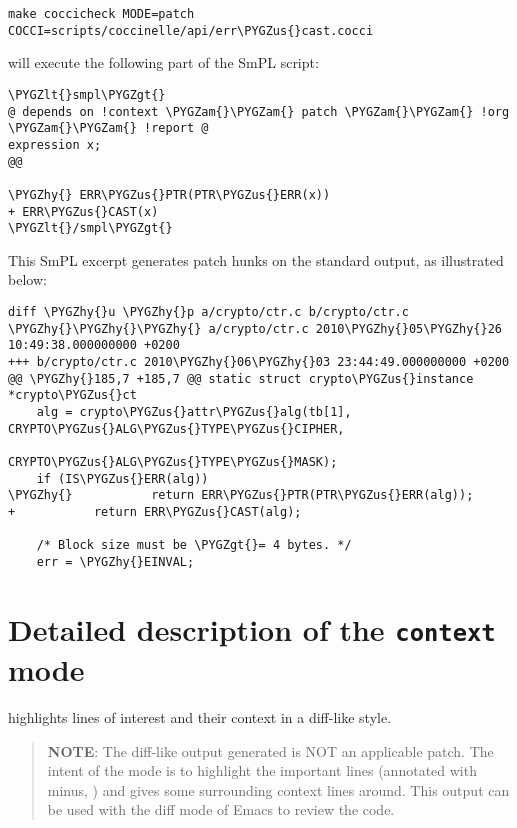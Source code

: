 \documentclass[a4paper,8pt,english]{sphinxmanual}
\def\PYGZus{\char`\_}
\def\PYGZam{\char`\&}
\def\PYGZlt{\char`\<}
\def\PYGZgt{\char`\>}
\def\PYGZhy{\char`\-}
\begin{document}
\begin{Verbatim}[commandchars=\\\{\}]
make coccicheck MODE=patch COCCI=scripts/coccinelle/api/err\PYGZus{}cast.cocci
\end{Verbatim}

will execute the following part of the SmPL script:

\begin{Verbatim}[commandchars=\\\{\}]
\PYGZlt{}smpl\PYGZgt{}
@ depends on !context \PYGZam{}\PYGZam{} patch \PYGZam{}\PYGZam{} !org \PYGZam{}\PYGZam{} !report @
expression x;
@@

\PYGZhy{} ERR\PYGZus{}PTR(PTR\PYGZus{}ERR(x))
+ ERR\PYGZus{}CAST(x)
\PYGZlt{}/smpl\PYGZgt{}
\end{Verbatim}

This SmPL excerpt generates patch hunks on the standard output, as
illustrated below:

\begin{Verbatim}[commandchars=\\\{\}]
diff \PYGZhy{}u \PYGZhy{}p a/crypto/ctr.c b/crypto/ctr.c
\PYGZhy{}\PYGZhy{}\PYGZhy{} a/crypto/ctr.c 2010\PYGZhy{}05\PYGZhy{}26 10:49:38.000000000 +0200
+++ b/crypto/ctr.c 2010\PYGZhy{}06\PYGZhy{}03 23:44:49.000000000 +0200
@@ \PYGZhy{}185,7 +185,7 @@ static struct crypto\PYGZus{}instance *crypto\PYGZus{}ct
    alg = crypto\PYGZus{}attr\PYGZus{}alg(tb[1], CRYPTO\PYGZus{}ALG\PYGZus{}TYPE\PYGZus{}CIPHER,
                              CRYPTO\PYGZus{}ALG\PYGZus{}TYPE\PYGZus{}MASK);
    if (IS\PYGZus{}ERR(alg))
\PYGZhy{}           return ERR\PYGZus{}PTR(PTR\PYGZus{}ERR(alg));
+           return ERR\PYGZus{}CAST(alg);

    /* Block size must be \PYGZgt{}= 4 bytes. */
    err = \PYGZhy{}EINVAL;
\end{Verbatim}


\section{Detailed description of the \texttt{context} mode}
\label{dev-tools/coccinelle:detailed-description-of-the-context-mode}
 highlights lines of interest and their context
in a diff-like style.
\begin{quote}

\textbf{NOTE}: The diff-like output generated is NOT an applicable patch. The
intent of the  mode is to highlight the important lines
(annotated with minus, \code{-}) and gives some surrounding context
lines around. This output can be used with the diff mode of
Emacs to review the code.
\end{quote}
\end{document}
